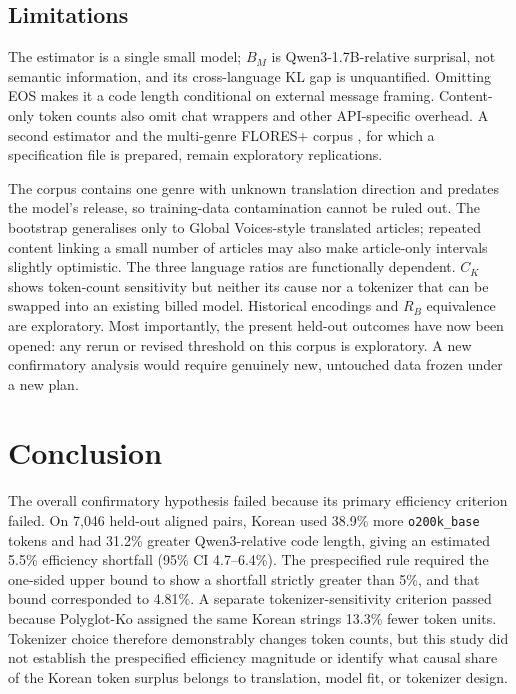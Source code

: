 \documentclass[11pt,a4paper]{article}
\newcommand{\RB}{R_{B}}
\newcommand{\CK}{C_{K}}
\begin{document}
\subsection{Limitations}

The estimator is a single small model; $B_M$ is Qwen3-1.7B-relative
surprisal, not semantic information, and its cross-language KL gap is
unquantified. Omitting EOS makes it a code length conditional on external
message framing. Content-only token counts also omit chat wrappers and other
API-specific overhead. A second estimator and the multi-genre FLORES+ corpus
\citep{floresplus}, for which a specification file is prepared, remain
exploratory replications.

The corpus contains one genre with unknown translation direction and predates
the model's release, so training-data contamination cannot be ruled out. The
bootstrap generalises only to Global Voices-style translated articles;
repeated content linking a small number of articles may also make
article-only intervals slightly optimistic. The three language ratios are
functionally dependent. $\CK$ shows token-count sensitivity but neither its
cause nor a tokenizer that can be swapped into an existing billed model.
Historical encodings and $\RB$ equivalence are exploratory. Most importantly,
the present held-out outcomes have now been opened: any rerun or revised
threshold on this corpus is exploratory. A new confirmatory analysis would
require genuinely new, untouched data frozen under a new plan.

\section{Conclusion}

The overall confirmatory hypothesis failed because its primary efficiency
criterion failed. On 7{,}046 held-out aligned pairs, Korean used 38.9\% more
\texttt{o200k\_base} tokens and had 31.2\% greater Qwen3-relative code length,
giving an estimated 5.5\% efficiency shortfall (95\% CI 4.7--6.4\%). The
prespecified rule required the one-sided upper bound to show a shortfall
strictly greater than 5\%, and that bound corresponded to 4.81\%. A separate
tokenizer-sensitivity criterion passed because Polyglot-Ko assigned the same
Korean strings 13.3\% fewer token units. Tokenizer choice therefore
demonstrably changes token counts, but this study did not establish the
prespecified efficiency magnitude or identify what causal share of the
Korean token surplus belongs to translation, model fit, or tokenizer design.
\end{document}

